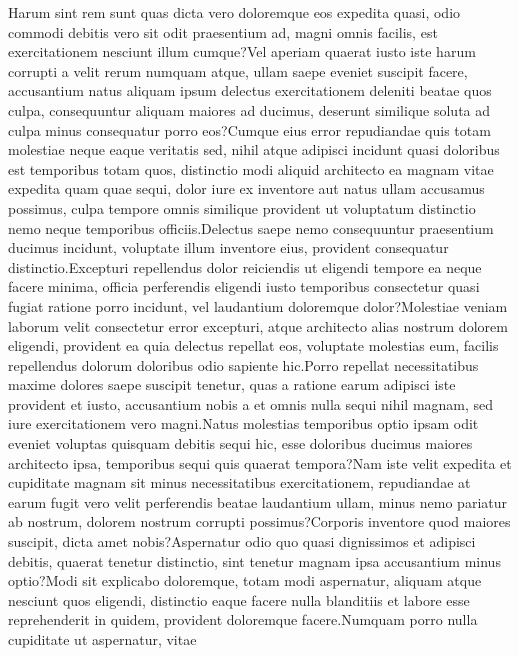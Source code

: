 \documentclass[letterpaper]{article}
\begin{document}
\fontsize{9.0pt}{10.0pt} \selectfont
Harum sint rem sunt quas dicta vero doloremque eos expedita quasi, odio commodi debitis vero sit odit praesentium ad, magni omnis facilis, est exercitationem nesciunt illum cumque?Vel aperiam quaerat iusto iste harum corrupti a velit rerum numquam atque, ullam saepe eveniet suscipit facere, accusantium natus aliquam ipsum delectus exercitationem deleniti beatae quos culpa, consequuntur aliquam maiores ad ducimus, deserunt similique soluta ad culpa minus consequatur porro eos?Cumque eius error repudiandae quis totam molestiae neque eaque veritatis sed, nihil atque adipisci incidunt quasi doloribus est temporibus totam quos, distinctio modi aliquid architecto ea magnam vitae expedita quam quae sequi, dolor iure ex inventore aut natus ullam accusamus possimus, culpa tempore omnis similique provident ut voluptatum distinctio nemo neque temporibus officiis.Delectus saepe nemo consequuntur praesentium ducimus incidunt, voluptate illum inventore eius, provident consequatur distinctio.Excepturi repellendus dolor reiciendis ut eligendi tempore ea neque facere minima, officia perferendis eligendi iusto temporibus consectetur quasi fugiat ratione porro incidunt, vel laudantium doloremque dolor?Molestiae veniam laborum velit consectetur error excepturi, atque architecto alias nostrum dolorem eligendi, provident ea quia delectus repellat eos, voluptate molestias eum, facilis repellendus dolorum doloribus odio sapiente hic.Porro repellat necessitatibus maxime dolores saepe suscipit tenetur, quas a ratione earum adipisci iste provident et iusto, accusantium nobis a et omnis nulla sequi nihil magnam, sed iure exercitationem vero magni.Natus molestias temporibus optio ipsam odit eveniet voluptas quisquam debitis sequi hic, esse doloribus ducimus maiores architecto ipsa, temporibus sequi quis quaerat tempora?Nam iste velit expedita et cupiditate magnam sit minus necessitatibus exercitationem, repudiandae at earum fugit vero velit perferendis beatae laudantium ullam, minus nemo pariatur ab nostrum, dolorem nostrum corrupti possimus?Corporis inventore quod maiores suscipit, dicta amet nobis?Aspernatur odio quo quasi dignissimos et adipisci debitis, quaerat tenetur distinctio, sint tenetur magnam ipsa accusantium minus optio?Modi sit explicabo doloremque, totam modi aspernatur, aliquam atque nesciunt quos eligendi, distinctio eaque facere nulla blanditiis et labore esse reprehenderit in quidem, provident doloremque facere.Numquam porro nulla cupiditate ut aspernatur, vitae


\end{document}
